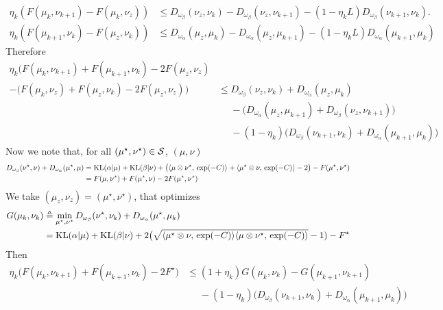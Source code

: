 \documentclass[a4paper, 10pt]{article}
\begin{document}
\begin{align}
    \eta_k (F(\mu_k,\nu_{k+1}) - F(\mu_k, \nu_z)) &\leq 
    D_{\omega_\beta}(\nu_z, \nu_k) - D_{\omega_\beta}(\nu_z, \nu_{k+1}) 
    - (1 - \eta_k L) D_{\omega_\beta}(\nu_{k+1}, \nu_k). \\
    \eta_k (F(\mu_{k+1},\nu_k) - F(\mu_z, \nu_k)) &\leq 
    D_{\omega_\alpha}(\mu_z, \mu_k) - D_{\omega_\alpha}(\mu_z, \mu_{k+1}) 
    - (1 - \eta_k L) D_{\omega_\alpha}(\mu_{k+1}, \mu_k)
\end{align}
Therefore
\begin{align}
    \eta_k \big(F(\mu_k,\nu_{k+1}) + F(\mu_{k+1},\nu_k) - 2 F(\mu_z, \nu_z) \\
     - ( F(\mu_k, \nu_z) + F(\mu_z, \nu_k) - 2 F(\mu_z, \nu_z)\big)
      &\leq 
    D_{\omega_\beta}(\nu_z, \nu_k) + D_{\omega_\alpha}(\mu_z, \mu_k) \\
    &\phantom{=}- \big(D_{\omega_\alpha}(\mu_z, \mu_{k+1})
     + D_{\omega_\beta}(\nu_z, \nu_{k+1})\big) \\
     &\phantom{=}
    - (1 - \eta_k) 
    \big(D_{\omega_\beta}(\nu_{k+1}, \nu_k) + D_{\omega_\alpha}(\mu_{k+1}, \mu_k)\big)
\end{align}
Now we note that, for all $(\mu^\star, \nu^\star) \in \mathcal{S}$, $(\mu,\nu)$
\begin{align}
    D_{\omega_\beta}
    (\nu^\star, \nu) + D_{\omega_\alpha}(\mu^\star, \mu)
    &= \text{KL}(\alpha|\mu) + \text{KL}(\beta|\nu) 
    + \big(\langle \mu \otimes\nu^\star,\,\exp(-C)\rangle
     +\langle \mu^\star \otimes\nu,\,\exp(-C)\rangle - 2\big) - F(\mu^\star, \nu^\star) \\
     &= F(\mu, \nu^\star) + F(\mu^\star, \nu) - 2 F(\mu^\star, \nu^\star)
\end{align}
We take $(\mu_z,\nu_z) = (\mu^\star,\nu^\star)$, that optimizes
\begin{align}
    G(\mu_k, \nu_k) &\triangleq \min_{\mu^\star, \nu^\star} D_{\omega_\beta}
    (\nu^\star, \nu_k) + D_{\omega_\alpha}(\mu^\star, \mu_k) \\
    &= \text{KL}(\alpha|\mu) + \text{KL}(\beta|\nu) 
    + 2 \big( \sqrt{\langle \mu^\star \otimes \nu,\,\exp(-C)\rangle 
    \langle \mu \otimes \nu^\star,\,\exp(-C)\rangle} - 1) - 
    F^\star
\end{align}
Then
\begin{align}
    \eta_k \big(F(\mu_k,\nu_{k+1}) + F(\mu_{k+1},\nu_k) - 2 F^\star)
     &\leq 
    (1 + \eta_k) G(\mu_k, \nu_k) - G(\mu_{k+1}, \nu_{k+1}) \\
    &\phantom{=}
    - (1 - \eta_k) 
    \big(D_{\omega_\beta}(\nu_{k+1}, \nu_k) + D_{\omega_\alpha}(\mu_{k+1}, \mu_k)\big)    
\end{align}
\end{document}
